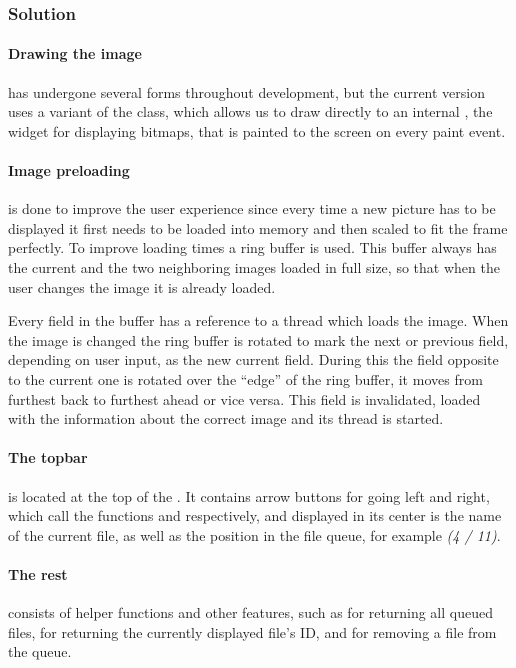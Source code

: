 \subsubsection{Solution} %

\paragraph{Drawing the image} has undergone several forms throughout development,
but the current version uses a variant of the  \cite{wxDC} class, which allows us to draw directly to an internal  \cite{wxBitmap}, the widget for displaying bitmaps,
that is painted to the screen on every paint event.

\paragraph{Image preloading} is done to improve the user experience since every
time a new picture has to be displayed it first needs to be loaded into memory
and then scaled to fit the frame perfectly. To improve loading times a ring
buffer is used. This buffer always has the current and the two neighboring
images loaded in full size, so that when the user changes the image it is
already loaded.

Every field in the buffer has a reference to a thread which loads the image.
When the image is changed the ring buffer is rotated to mark the next or
previous field, depending on user input, as the new current field. During this
the field opposite to the current one is rotated over the ``edge'' of the ring
buffer, it moves from furthest back to furthest ahead or vice versa. This field
is invalidated, loaded with the information about the correct image and its
thread is started.

\paragraph{The topbar} is located at the top of the . It contains arrow buttons for going left and right, which call the functions  and  respectively, and displayed in its center is the name of the current file, as well as the position in the file queue, for example \emph{(4 / 11)}.

\paragraph{The rest} consists of helper functions and other features, such as 
 for returning all queued files,  for returning the currently displayed file's ID, and  for removing a file from the queue.

